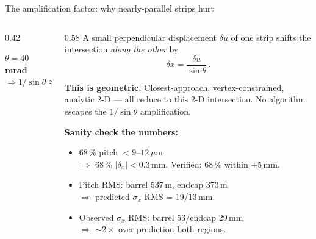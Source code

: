 \documentclass[aspectratio=169,10pt]{beamer}
\begin{document}
\begin{frame}{The amplification factor: why nearly-parallel strips hurt}

\begin{columns}[T]
\begin{column}{0.42\textwidth}
\centering
{}

\bigskip
\footnotesize
\textbf{$\theta = 40$\,mrad $\Rightarrow 1/\sin\theta \approx 25$}
\end{column}
\begin{column}{0.58\textwidth}
\footnotesize
A small perpendicular displacement $\delta u$ of one strip shifts the intersection \emph{along the other} by
\[
\delta x = \frac{\delta u}{\sin\theta}\,.
\]

\textbf{This is geometric.} Closest-approach, vertex-constrained, analytic 2-D — all reduce to this 2-D intersection. \alert{No algorithm escapes the $1/\sin\theta$ amplification.}

\smallskip
\textbf{Sanity check the numbers:}
\begin{itemize}\itemsep0pt
  \item 68\,\% pitch $< 9$--$12\,\mu$m\\
    $\Rightarrow$ 68\,\% $|\delta_x| < 0.3$\,mm. \alert{Verified: 68\,\% within $\pm 5$\,mm.}
  \item Pitch RMS: barrel 537\,\textmu m, endcap 373\,\textmu m\\
    $\Rightarrow$ predicted $\sigma_x$ RMS = 19/13\,mm.
  \item Observed $\sigma_x$ RMS: barrel 53/endcap 29\,mm\\
    $\Rightarrow$ \alert{$\sim 2\times$ over prediction} both regions.
\end{itemize}


\end{column}
\end{columns}
\end{frame}
\end{document}
